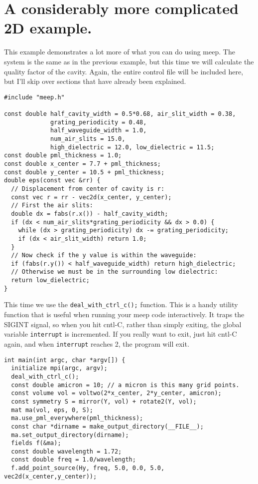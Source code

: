 \begin{comment}
/*
\end{comment}
\section{A considerably more complicated 2D example.}
\begin{comment}
*/
\end{comment}

This example demonstrates a lot more of what you can do using meep.  The
system is the same as in the previous example, but this time we will
calculate the quality factor of the cavity.  Again, the entire control file
will be included here, but I'll skip over sections that have already been
explained.

\begin{verbatim}
#include "meep.h"

const double half_cavity_width = 0.5*0.68, air_slit_width = 0.38,
             grating_periodicity = 0.48,
             half_waveguide_width = 1.0,
             num_air_slits = 15.0,
             high_dielectric = 12.0, low_dielectric = 11.5;
const double pml_thickness = 1.0;
const double x_center = 7.7 + pml_thickness;
const double y_center = 10.5 + pml_thickness;
double eps(const vec &rr) {
  // Displacement from center of cavity is r:
  const vec r = rr - vec2d(x_center, y_center);
  // First the air slits:
  double dx = fabs(r.x()) - half_cavity_width;
  if (dx < num_air_slits*grating_periodicity && dx > 0.0) {
    while (dx > grating_periodicity) dx -= grating_periodicity;
    if (dx < air_slit_width) return 1.0;
  }
  // Now check if the y value is within the waveguide:
  if (fabs(r.y()) < half_waveguide_width) return high_dielectric;
  // Otherwise we must be in the surrounding low dielectric:
  return low_dielectric;
}
\end{verbatim}
This time we use the \verb!deal_with_ctrl_c();! function.  This is a handy
utility function that is useful when running your meep code
interactively.  It traps the SIGINT signal, so when you hit cntl-C, rather
than simply exiting, the global variable \verb!interrupt! is incremented.
If you really want to exit, just hit cntl-C again, and when
\verb!interrupt! reaches 2, the program will exit.
\begin{verbatim}
int main(int argc, char *argv[]) {
  initialize mpi(argc, argv);
  deal_with_ctrl_c();
  const double amicron = 10; // a micron is this many grid points.
  const volume vol = voltwo(2*x_center, 2*y_center, amicron);
  const symmetry S = mirror(Y, vol) + rotate2(Y, vol);
  mat ma(vol, eps, 0, S);
  ma.use_pml_everywhere(pml_thickness);
  const char *dirname = make_output_directory(__FILE__);
  ma.set_output_directory(dirname);
  fields f(&ma);
  const double wavelength = 1.72;
  const double freq = 1.0/wavelength;
  f.add_point_source(Hy, freq, 5.0, 0.0, 5.0, vec2d(x_center,y_center));
\end{verbatim}

